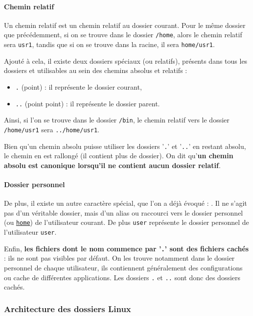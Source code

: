 \paragraph{Chemin relatif}

Un chemin relatif est un chemin relatif au dossier courant. Pour le même dossier que précédemment, si on se trouve dans le dossier \texttt{/home}, alors le chemin relatif sera \texttt{usr1}, tandis que si on se trouve dans la racine, il sera \texttt{home/usr1}.

Ajouté à cela, il existe deux dossiers spéciaux (ou relatifs), présents dans tous les dossiers et utilisables au sein des chemins absolus et relatifs : 
\begin{itemize}
    \item \texttt{.} (point) : il représente le dossier courant,
    \item \texttt{..} (point point) : il représente le dossier parent.
\end{itemize}

Ainsi, si l'on se trouve dans le dossier \texttt{/bin}, le chemin relatif vers le dossier \texttt{/home/usr1} sera \texttt{../home/usr1}.

 Bien qu'un chemin absolu puisse utiliser les dossiers '\texttt{.}' et '\texttt{..}' en restant absolu, le chemin en est rallongé (il contient plus de dossier). On dit qu'\textbf{un chemin absolu est canonique lorsqu'il ne contient aucun dossier relatif}.

\paragraph{Dossier personnel}

De plus, il existe un autre caractère spécial, que l'on a déjà évoqué : \texttt{\tilde}. Il ne s'agit pas d'un véritable dossier, mais d'un alias ou raccourci vers le dossier personnel (ou \hyperref[sec:dirhome]{\texttt{home}}) de l'utilisateur courant. De plus \texttt{\tilde user} représente le dossier personnel de l'utilisateur \texttt{user}.

Enfin, \textbf{les fichiers dont le nom commence par '\texttt{.}' sont des fichiers cachés} : ils ne sont pas visibles par défaut. On les trouve notamment dans le dossier personnel de chaque utilisateur, ils contiennent généralement des configurations ou cache de différentes applications. Les dossiers \texttt{.} et \texttt{..} sont donc des dossiers cachés.

\newpage
\subsubsection{Architecture des dossiers Linux}

